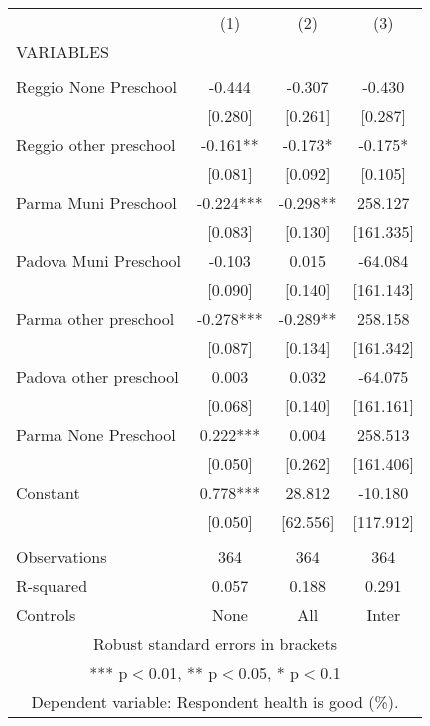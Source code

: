 \begin{tabular}{lccc} \hline
 & (1) & (2) & (3) \\
VARIABLES &  &  &  \\ \hline
 &  &  &  \\
Reggio None Preschool & -0.444 & -0.307 & -0.430 \\
 & [0.280] & [0.261] & [0.287] \\
Reggio other preschool & -0.161** & -0.173* & -0.175* \\
 & [0.081] & [0.092] & [0.105] \\
Parma Muni Preschool & -0.224*** & -0.298** & 258.127 \\
 & [0.083] & [0.130] & [161.335] \\
Padova Muni Preschool & -0.103 & 0.015 & -64.084 \\
 & [0.090] & [0.140] & [161.143] \\
Parma other preschool & -0.278*** & -0.289** & 258.158 \\
 & [0.087] & [0.134] & [161.342] \\
Padova other preschool & 0.003 & 0.032 & -64.075 \\
 & [0.068] & [0.140] & [161.161] \\
Parma None Preschool & 0.222*** & 0.004 & 258.513 \\
 & [0.050] & [0.262] & [161.406] \\
Constant & 0.778*** & 28.812 & -10.180 \\
 & [0.050] & [62.556] & [117.912] \\
 &  &  &  \\
Observations & 364 & 364 & 364 \\
R-squared & 0.057 & 0.188 & 0.291 \\
 Controls & None & All & Inter \\ \hline
\multicolumn{4}{c}{ Robust standard errors in brackets} \\
\multicolumn{4}{c}{ *** p$<$0.01, ** p$<$0.05, * p$<$0.1} \\
\multicolumn{4}{c}{ Dependent variable: Respondent health is good (\%).} \\
\end{tabular}
